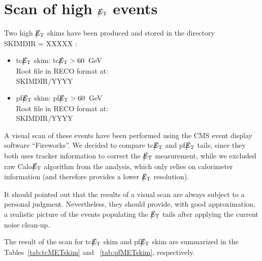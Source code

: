 \section{Scan of high $\big\slash\hspace{-1.6ex}{E_\text{T}}$ events}

Two high $\big\slash\hspace{-1.6ex}{E_\text{T}}$ skims have been produced and stored in the directory \\ 
SKIMDIR = XXXXX :
\begin{itemize}
\item tc$\big\slash\hspace{-1.6ex}{E_\text{T}}$ skim: tc$\big\slash\hspace{-1.6ex}{E_\text{T}}>60$~GeV \\ 
Root file in RECO format at: \\ SKIMDIR/YYYY
\item pf$\big\slash\hspace{-1.6ex}{E_\text{T}}$ skim: pf$\big\slash\hspace{-1.6ex}{E_\text{T}}>60$~GeV \\
Root file in RECO format at: \\ SKIMDIR/YYYY
\end{itemize}

A visual scan of these events have been performed using the CMS event display
software ``Fireworks''. We decided to compare tc$\big\slash\hspace{-1.6ex}{E_\text{T}}$ and pf$\big\slash\hspace{-1.6ex}{E_\text{T}}$ 
tails, since they both uses tracker information to correct the $\big\slash\hspace{-1.6ex}{E_\text{T}}$ 
measurement, while we excluded raw Calo$\big\slash\hspace{-1.6ex}{E_\text{T}}$ algorithm from the analysis, which only relies 
on calorimeter information (and therefore provides a lower $\big\slash\hspace{-1.6ex}{E_\text{T}}$ resolution).

It should pointed out that the results of a visual scan 
are always subject to a personal judgment. 
Nevertheless, they should provide, with good approximation, a realistic 
picture of the events populating the $\big\slash\hspace{-1.6ex}{E_\text{T}}$ tails after applying 
the current noise clean-up. 

The result of the scan for tc$\big\slash\hspace{-1.6ex}{E_\text{T}}$ skim and pf$\big\slash\hspace{-1.6ex}{E_\text{T}}$ skim are summarized 
in the Tables~\ref{tab:tcMETskim} and ~\ref{tab:pfMETskim}, respectively.

